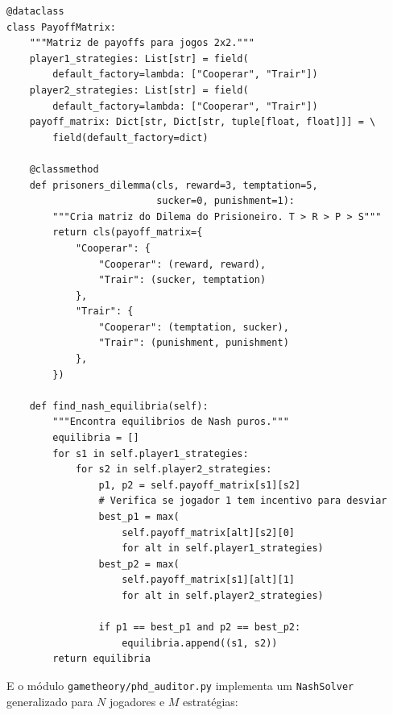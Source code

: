 \begin{verbatim}
@dataclass
class PayoffMatrix:
    """Matriz de payoffs para jogos 2x2."""
    player1_strategies: List[str] = field(
        default_factory=lambda: ["Cooperar", "Trair"])
    player2_strategies: List[str] = field(
        default_factory=lambda: ["Cooperar", "Trair"])
    payoff_matrix: Dict[str, Dict[str, tuple[float, float]]] = \
        field(default_factory=dict)

    @classmethod
    def prisoners_dilemma(cls, reward=3, temptation=5,
                          sucker=0, punishment=1):
        """Cria matriz do Dilema do Prisioneiro. T > R > P > S"""
        return cls(payoff_matrix={
            "Cooperar": {
                "Cooperar": (reward, reward),
                "Trair": (sucker, temptation)
            },
            "Trair": {
                "Cooperar": (temptation, sucker),
                "Trair": (punishment, punishment)
            },
        })

    def find_nash_equilibria(self):
        """Encontra equilibrios de Nash puros."""
        equilibria = []
        for s1 in self.player1_strategies:
            for s2 in self.player2_strategies:
                p1, p2 = self.payoff_matrix[s1][s2]
                # Verifica se jogador 1 tem incentivo para desviar
                best_p1 = max(
                    self.payoff_matrix[alt][s2][0]
                    for alt in self.player1_strategies)
                best_p2 = max(
                    self.payoff_matrix[s1][alt][1]
                    for alt in self.player2_strategies)

                if p1 == best_p1 and p2 == best_p2:
                    equilibria.append((s1, s2))
        return equilibria
\end{verbatim}

E o módulo \texttt{gametheory/phd\_auditor.py} implementa um \texttt{NashSolver} generalizado para $N$ jogadores e $M$ estratégias:

